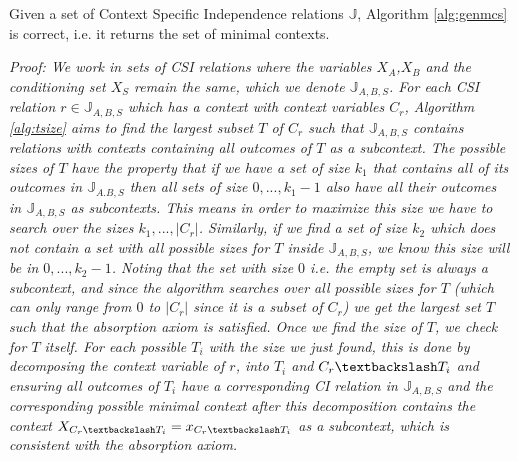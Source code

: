 \documentclass{tufte-book}
\begin{document}
\begin{theorem}\label{alg:genmcscorrectness}
Given a set of Context Specific Independence relations $\mathbb{J}$, Algorithm \ref{alg:genmcs} is correct, i.e. it returns the set of minimal contexts.
\end{theorem}


\textit{Proof: We work in sets of CSI relations where the variables $X_A$,$X_B$ and the conditioning set $X_S$ remain the same, which we denote $\mathbb{J}_{A,B,S}$. For each CSI relation $r \in \mathbb{J}_{A,B,S}$ which has a context with context variables $C_r$, Algorithm \ref{alg:tsize} aims to find the largest subset $T$ of $C_r$ such that $\mathbb{J}_{A,B,S}$ contains relations with contexts containing all outcomes of $T$ as a subcontext. The possible sizes of $T$ have the property that if we have a set of size $k_1$ that contains all of its outcomes in $\mathbb{J}_{A.B,S}$ then all sets of size $0,...,k_1-1$ also have all their outcomes in $\mathbb{J}_{A,B,S}$ as subcontexts. This means in order to maximize this size we  have to search over the sizes $k_1,...,|C_r|$. Similarly, if we find a set of size $k_2$ which does not contain a set with all possible sizes for $T$ inside $\mathbb{J}_{A,B,S}$, we know this size will be in $0,...,k_2-1$. Noting that the set with size $0$ i.e. the empty set is always a subcontext, and since the algorithm searches over all possible sizes for $T$ (which can only range from $0$ to $|C_r|$ since it is a subset of $C_r$) we get the largest set $T$ such that the absorption axiom is satisfied. Once we find the size of $T$, we check for $T$ itself. For each possible $T_i$ with the size we just found, this is done by decomposing the context variable of $r$, into $T_i$ and $C_r\textbackslash T_i$ and ensuring all outcomes of $T_i$ have a corresponding CI relation in $\mathbb{J}_{A,B,S}$ and the corresponding possible minimal context after this decomposition contains the context $X_{C_r\textbackslash T_i} = x_{C_r \textbackslash T_i}$ as a subcontext, which is consistent with the absorption axiom.}
\end{document}
